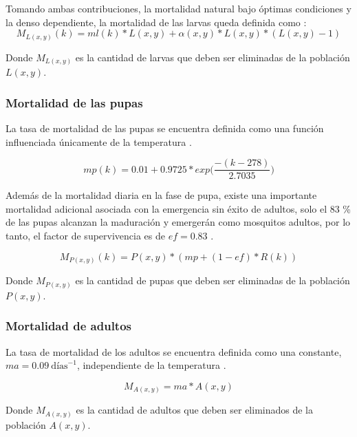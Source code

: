 Tomando ambas contribuciones, la mortalidad natural bajo óptimas condiciones y la denso
dependiente, la mortalidad de las larvas queda definida como :
\begin{equation}
    M_{L(x,y)}(k) = ml(k) * L(x,y) + \alpha (x,y) * L(x,y) * (L(x,y) - 1)
\end{equation}

Donde $M_{L(x,y)}$ es la cantidad de larvas que deben ser eliminadas de la población $L(x,y)$.

\subsubsection{Mortalidad de las pupas}
La tasa de mortalidad de las pupas se encuentra definida como una función influenciada únicamente
de la temperatura \cite{otero2006stochastic}.

\begin{equation}
\label{eq:mortalidad-natural-pupas}
    mp(k) = 0.01 + 0.9725 * exp\bigg( \frac{-(k - 278)}{2.7035}\bigg)
\end{equation}

Además de la mortalidad diaria en la fase de pupa, existe una importante mortalidad adicional
asociada con la emergencia sin éxito de adultos, solo el 83 \%  de las pupas alcanzan la maduración
y emergerán como mosquitos adultos, por lo tanto, el factor de supervivencia es de $ef = 0.83$
\cite{otero2006stochastic}.

\begin{equation}
    M_{P(x,y)}(k) = P(x,y) * (mp + (1 - ef) * R(k))
\end{equation}

Donde $M_{P(x,y)}$ es la cantidad de pupas que deben ser eliminadas de la población $P(x,y)$.

\subsubsection{Mortalidad de adultos}
La tasa de mortalidad de los adultos se encuentra definida como una constante,
$ma = 0.09\ \text{días}^{-1}$, independiente de la temperatura \cite{otero2006stochastic}.

\begin{equation}
    M_{A(x,y)} = ma * A(x,y)
\end{equation}

Donde $M_{A(x,y)}$ es la cantidad de adultos que deben ser eliminados de la población $A(x,y)$.
